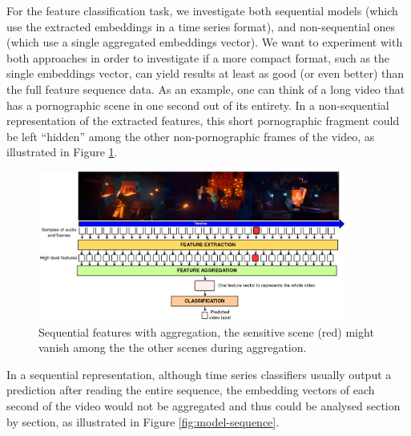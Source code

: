 For the feature classification task, we investigate both sequential models (which use the extracted embeddings in a time series format), and non-sequential ones (which use a single aggregated embeddings vector).
We want to experiment with both approaches in order to investigate if a more compact format, such as the single embeddings vector, can yield results at least as good (or even better) than the full feature sequence data.
As an example, one can think of a long video that has a pornographic scene in one second out of its entirety. 
In a non-sequential representation of the extracted features, this short pornographic fragment could be left ``hidden'' among the other non-pornographic frames of the video, as illustrated in Figure \ref{fig:model-non-sequence}.
\begin{figure}[!ht]
    \centering
    \includegraphics[width=0.9\textwidth]{img/model-non-sequence.png}
    \caption{Sequential features with aggregation, the sensitive scene (red) might vanish among the the other scenes during aggregation.}
    \label{fig:model-non-sequence}
    \vspace{-1em}
\end{figure}
In a sequential representation, although time series classifiers usually output a prediction after reading the entire sequence, the embedding vectors of each second of the video would not be aggregated and thus could be analysed section by section, as illustrated in Figure \ref{fig:model-sequence}.

